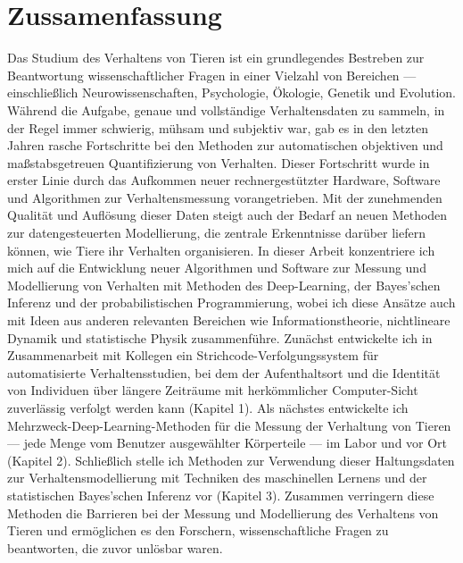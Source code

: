 	\chapter*{Zussamenfassung}
  Das Studium des Verhaltens von Tieren ist ein grundlegendes Bestreben zur Beantwortung wissenschaftlicher Fragen in einer Vielzahl von Bereichen --- einschließlich Neurowissenschaften, Psychologie, Ökologie, Genetik und Evolution. Während die Aufgabe, genaue und vollständige Verhaltensdaten zu sammeln, in der Regel immer schwierig, mühsam und subjektiv war, gab es in den letzten Jahren rasche Fortschritte bei den Methoden zur automatischen objektiven und maßstabsgetreuen Quantifizierung von Verhalten. Dieser Fortschritt wurde in erster Linie durch das Aufkommen neuer rechnergestützter Hardware, Software und Algorithmen zur Verhaltensmessung vorangetrieben. Mit der zunehmenden Qualität und Auflösung dieser Daten steigt auch der Bedarf an neuen Methoden zur datengesteuerten Modellierung, die zentrale Erkenntnisse darüber liefern können, wie Tiere ihr Verhalten organisieren. In dieser Arbeit konzentriere ich mich auf die Entwicklung neuer Algorithmen und Software zur Messung und Modellierung von Verhalten mit Methoden des Deep-Learning, der Bayes'schen Inferenz und der probabilistischen Programmierung, wobei ich diese Ansätze auch mit Ideen aus anderen relevanten Bereichen wie Informationstheorie, nichtlineare Dynamik und statistische Physik zusammenführe. Zunächst entwickelte ich in Zusammenarbeit mit Kollegen ein Strichcode-Verfolgungssystem für automatisierte Verhaltensstudien, bei dem der Aufenthaltsort und die Identität von Individuen über längere Zeiträume mit herkömmlicher Computer-Sicht zuverlässig verfolgt werden kann (Kapitel 1). Als nächstes entwickelte ich Mehrzweck-Deep-Learning-Methoden für die Messung der Verhaltung von Tieren --- jede Menge vom Benutzer ausgewählter Körperteile --- im Labor und vor Ort (Kapitel 2). Schließlich stelle ich Methoden zur Verwendung dieser Haltungsdaten zur Verhaltensmodellierung mit Techniken des maschinellen Lernens und der statistischen Bayes'schen Inferenz vor (Kapitel 3). Zusammen verringern diese Methoden die Barrieren bei der Messung und Modellierung des Verhaltens von Tieren und ermöglichen es den Forschern, wissenschaftliche Fragen zu beantworten, die zuvor unlösbar waren.
